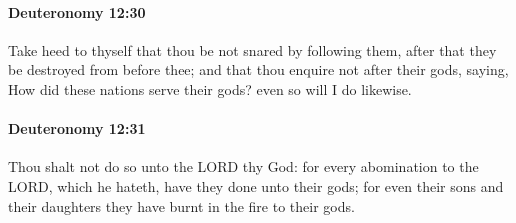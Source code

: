 		\paragraph{Deuteronomy 12:30} %
			\label{DEUTERONOMY-12-30}

			Take heed to thyself that thou be not snared by following them, after that they be destroyed from before thee; and that thou enquire not after their gods, saying, How did these nations serve their gods? even so will I do likewise.


		\paragraph{Deuteronomy 12:31} %
			\label{DEUTERONOMY-12-31}

			Thou shalt not do so unto the LORD thy God: for every abomination to the LORD, which he hateth, have they done unto their gods; for even their sons and their daughters they have burnt in the fire to their gods.

